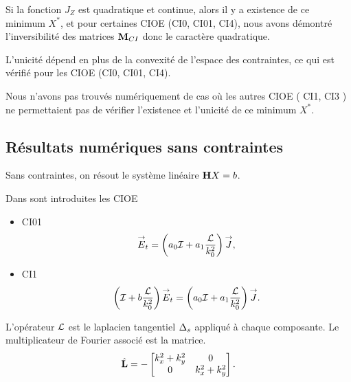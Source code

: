       Si la fonction \(J_Z\) est quadratique et continue, alors il y a existence de ce minimum \(X^*\), et pour certaines CIOE (CI0, CI01, CI4), nous avons démontré l'inversibilité des matrices \(\mathbf{M}_{CI}\) donc le caractère quadratique.

      L'unicité dépend en plus de la convexité de l'espace des contraintes, ce qui est vérifié pour les CIOE (CI0, CI01, CI4).

      Nous n'avons pas trouvés numériquement de cas où les autres CIOE ( CI1, CI3 ) ne permettaient pas de vérifier l'existence et l'unicité de ce minimum \(X^*\).


  \subsection{Résultats numériques sans contraintes}

      Sans contraintes, on résout le système linéaire \(\mathbf{H} X = b\). 

      Dans \cite{stupfel_implementation_2015} sont introduites les CIOE
      \begin{itemize}
        \item CI01
          \begin{equation*}
            {\overset{\rightarrow}{E}}_t = \left(a_0{\mathcal{I}} + a_1\dfrac{\mathcal{L}}{k_0^2}\right){\overset{\rightarrow}{J}},
          \end{equation*}
        \item CI1
          \begin{equation*}
            \left({\mathcal{I}} + b\dfrac{\mathcal{L}}{k_0^2} \right){\overset{\rightarrow}{E}}_t = \left(a_0{\mathcal{I}} + a_1\dfrac{\mathcal{L}}{k_0^2}\right){\overset{\rightarrow}{J}}.
          \end{equation*}
      \end{itemize}

      L'opérateur \(\mathcal{L}\) est le laplacien tangentiel \(\Delta_s\) appliqué à chaque composante.
      Le multiplicateur de Fourier associé est la matrice.
      \begin{equation*}
        \hat{\mathbf{L}}  = -
        \begin{bmatrix}
          k_x^2 + k_y^2 & 0
          \\
          0 & k_x^2 + k_y^2
        \end{bmatrix}.
      \end{equation*}

